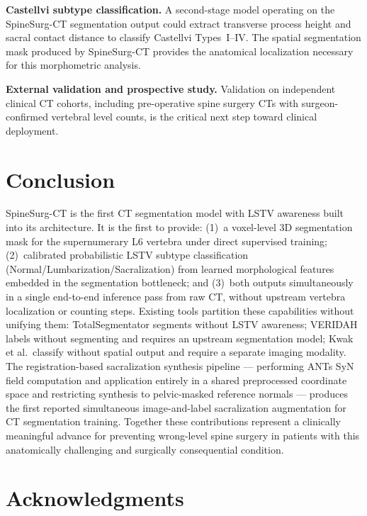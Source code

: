 \documentclass{article}
\begin{document}
\textbf{Castellvi subtype classification.}
A second-stage model operating on the SpineSurg-CT segmentation output could
extract transverse process height and sacral contact distance to classify
Castellvi Types~I--IV. The spatial segmentation mask produced by SpineSurg-CT
provides the anatomical localization necessary for this morphometric analysis.

\textbf{External validation and prospective study.}
Validation on independent clinical CT cohorts, including pre-operative spine
surgery CTs with surgeon-confirmed vertebral level counts, is the critical next
step toward clinical deployment.

\section{Conclusion}

SpineSurg-CT is the first CT segmentation model with LSTV awareness built
into its architecture. It is the first to provide: (1)~a voxel-level 3D
segmentation mask for the supernumerary L6 vertebra under direct supervised
training; (2)~calibrated probabilistic LSTV subtype classification
(Normal/Lumbarization/Sacralization) from learned morphological features embedded
in the segmentation bottleneck; and (3)~both outputs simultaneously in a single
end-to-end inference pass from raw CT, without upstream vertebra localization or
counting steps. Existing tools partition these capabilities without unifying them:
TotalSegmentator segments without LSTV awareness; VERIDAH labels without
segmenting and requires an upstream segmentation model; Kwak et al.\ classify
without spatial output and require a separate imaging modality. The registration-based
sacralization synthesis pipeline --- performing ANTs SyN field computation and
application entirely in a shared preprocessed coordinate space and restricting
synthesis to pelvic-masked reference normals --- produces the first reported
simultaneous image-and-label sacralization augmentation for CT segmentation
training. Together these contributions represent a clinically meaningful advance
for preventing wrong-level spine surgery in patients with this anatomically
challenging and surgically consequential condition.

\section*{Acknowledgments}
\end{document}
